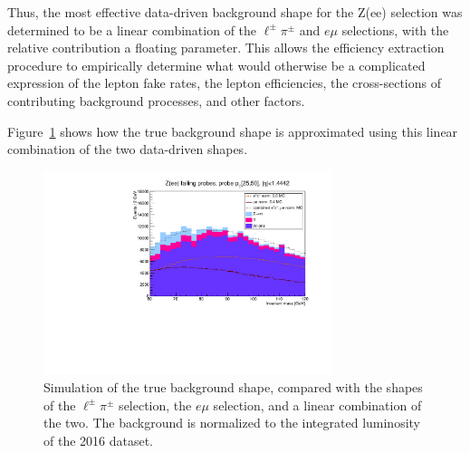 Thus, the most effective data-driven background shape for the Z(ee) selection was determined to be a linear combination of
the \ensuremath{\ell^{\pm}\pi^{\pm}} and \ensuremath{e\mu} selections, with the relative contribution a floating parameter.
This allows the efficiency extraction procedure to empirically determine what would otherwise be a
complicated expression of the lepton fake rates, the lepton efficiencies, 
the cross-sections of contributing background processes, and other factors.

Figure~\ref{fig:ZeeEPiEMu} shows how the true background shape is approximated using this linear combination of the two data-driven shapes.

\begin{figure}
	\centering
	\includegraphics[width=0.75\textwidth]{figures/ZeeEPiEMu.pdf}
	\caption{Simulation of the true background shape, compared with the shapes of the \ensuremath{\ell^{\pm}\pi^{\pm}} selection, the \ensuremath{e\mu} selection, and a linear combination of the two.
    The background is normalized to the integrated luminosity of the 2016 dataset.}
	\label{fig:ZeeEPiEMu}
\end{figure}
